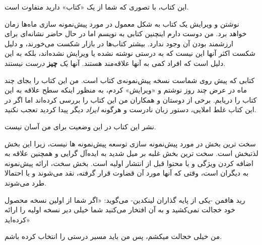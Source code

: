این کتاب، با تصوری که شما از یک «کتاب» دارید متفاوت است.

نوشتن و ویرایش یک کتاب به شکل معمول در مورد پیش‌نمونه سازی ماه‌ها زمان
خواهد برد. من دوست دارم اینچنین کتابی به نویسم اما در حال حاضر نشانه‌ای
برای ارزشمند بودن آن وجود ندارد. بیشتر کتاب‌ها در بازار شکست می‌خورند، و
دلیل شکست اکثر آنها این نیست که به درستی نوشته نشده یا ویرایش نشده‌اند،
بلکه به این دلیل است که افراد کمی به آنها علاقه‌مند هستند. آنها
\emph{یک} \textbf{چیز} \emph{درست} نیستند.

کتابی که پیش روی شماست نسخه پیش‌نمونه‌ی کتاب است. من این کتاب را بجای
چند ماه در عرض چند روز نوشتم و «ویرایش» کردم، به منظور اینکه سطح علاقه
به این کتاب را دریابم. برخی از دوستان و همکاران من این کتاب را بررسی
کرده‌اند اما اگر در این کتاب غلط املایی، دستور زبان نادرست و هرگونه
\emph{ایراد} دیگر پیدا کردید تعجب نکنید.

نشر این کتاب در این وضعیت برای من آسان نیست.

سخت ترین بخش در مورد پیش‌نمونه سازی توسعه پیش‌نمونه ها نیست، زیرا این
بخش لذتبخش است. سخت ترین بخش غلبه بر میل شدید به ایده‌آل گرایی و همچنین
علاقه به اضافه کردن ویژگی و یا محتوا قبل از انتشار اولیه است. بخش سخت،
ارائه پیش‌نمونه به دیگران است، وقتی که آنها مورد آن قضاوت قرار گرفته،
نقد می‌شوند و یا احتمالا طرد می‌شوند.

رید هافمن -یکی از پایه گذاران لینکدین- می‌گوید: «اگر شما از اولین نسخه
محصول خود خجالت نمی‌کشید و به آن افتخار می‌کنید شما خیلی دیر نسخه اولیه
را ارائه کرده‌اید»

من خیلی خجالت میکشم، پس من باید مسیر درستی را انتخاب کرده باشم.
